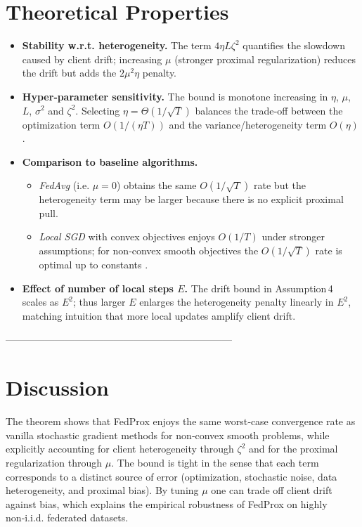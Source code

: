 \documentclass{article}
\begin{document}
\section*{Theoretical Properties}
\begin{itemize}[leftmargin=*]
\item \textbf{Stability w.r.t. heterogeneity.} The term $4\eta L\zeta^{2}$ quantifies the slowdown caused by client drift; increasing $\mu$ (stronger proximal regularization) reduces the drift but adds the $2\mu^{2}\eta$ penalty.
\item \textbf{Hyper‑parameter sensitivity.} The bound is monotone increasing in $\eta$, $\mu$, $L$, $\sigma^{2}$ and $\zeta^{2}$. Selecting $\eta = \Theta(1/\sqrt{T})$ balances the trade‑off between the optimization term $O(1/(\eta T))$ and the variance/heterogeneity term $O(\eta)$.
\item \textbf{Comparison to baseline algorithms.}
  \begin{itemize}
    \item \textit{FedAvg} (i.e. $\mu=0$) obtains the same $O(1/\sqrt{T})$ rate but the heterogeneity term may be larger because there is no explicit proximal pull.
    \item \textit{Local SGD} with convex objectives enjoys $O(1/T)$ under stronger assumptions; for non‑convex smooth objectives the $O(1/\sqrt{T})$ rate is optimal up to constants \cite{ghadimi2013stochastic}.
  \end{itemize}
\item \textbf{Effect of number of local steps $E$.} The drift bound in Assumption 4 scales as $E^{2}$; thus larger $E$ enlarges the heterogeneity penalty linearly in $E^{2}$, matching intuition that more local updates amplify client drift.
\end{itemize}

---------------------------------------------------------------------

\section*{Discussion}
The theorem shows that FedProx enjoys the same worst‑case convergence rate as vanilla stochastic gradient methods for non‑convex smooth problems, while explicitly accounting for client heterogeneity through $\zeta^{2}$ and for the proximal regularization through $\mu$. The bound is tight in the sense that each term corresponds to a distinct source of error (optimization, stochastic noise, data heterogeneity, and proximal bias). By tuning $\mu$ one can trade off client drift against bias, which explains the empirical robustness of FedProx on highly non‑i.i.d. federated datasets.
\end{document}
